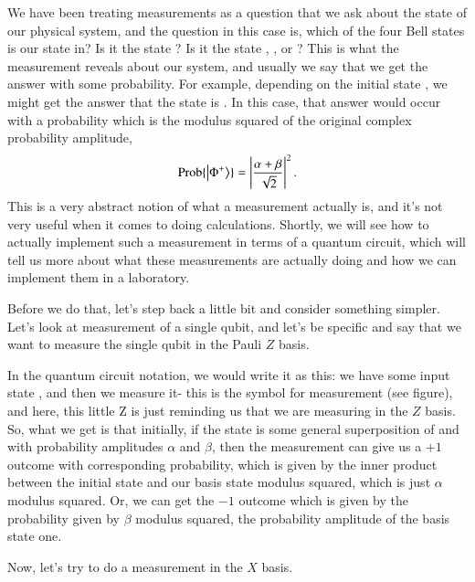We have been treating measurements as a question that we ask about the state of our physical system, and the question in this case is, which of the four Bell states is our state in? Is it the state \ket{\Phi^+}? Is it the state \ket{\Phi^-}, \ket{\Psi^+}, or \ket{\Psi^-}? This is what the measurement reveals about our system, and usually we say that we get the answer with some probability. For example, depending on the initial state \ket{\psi}, we might get the answer that the state is \ket{\Phi^+}. In this case, that answer would occur with a probability which is the modulus squared of the original complex probability amplitude,
\begin{equation}
\operatorname{Prob}\{\left| \Phi^+ \right\rangle\}=\left|\frac{\alpha+\beta}{\sqrt{2}}\right|^2.
\end{equation}
This is a very abstract notion of what a measurement actually is, and it's not very useful when it comes to doing calculations. Shortly, we will see how to actually implement such a measurement in terms of a quantum circuit, which will tell us more about what these measurements are actually doing and how we can implement them in a laboratory.

Before we do that, let's step back a little bit and consider something simpler. Let's look at measurement of a single qubit, and let's be specific and say that we want to measure the single qubit in the Pauli $Z$ basis.


In the quantum circuit notation, we would write it as this: we have some input state \ket{\psi}, and then we measure it- this is the symbol for measurement (see figure), and here, this little Z is just reminding us that we are measuring in the $Z$ basis.  So, what we get is that initially, if the state is some general superposition of  and  with probability amplitudes $\alpha$ and $\beta$, then the measurement can give us a $+1$ outcome with corresponding probability, which is given by the inner product between the initial state and our basis state  modulus squared, which is just $\alpha$ modulus squared. Or, we can get the  $-1$ outcome which is given by the probability given by $\beta$ modulus squared, the probability amplitude of the basis state one.

Now, let's try to do a measurement in the $X$ basis.

